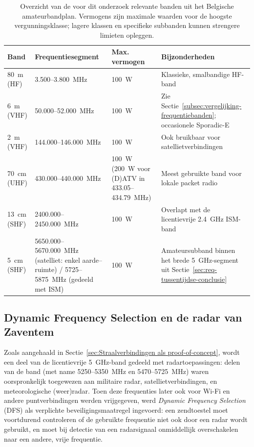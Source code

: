 \begin{table}[h]
  \centering
  \small
  \begin{tabular}{p{2.6cm}p{3.2cm}p{2.6cm}p{5.2cm}}
    \toprule
    \textbf{Band} & \textbf{Frequentiesegment} & \textbf{Max. vermogen} & \textbf{Bijzonderheden} \\
    \midrule
    80~m (HF)     & 3.500--3.800~MHz   & 100~W & Klassieke, smalbandige HF-band \\
    6~m (VHF)     & 50.000--52.000~MHz & 100~W & Zie Sectie~\ref{subsec:vergelijking-frequentiebanden}; occasionele Sporadic-E \\
    2~m (VHF)     & 144.000--146.000~MHz & 100~W & Ook bruikbaar voor satellietverbindingen \\
    70~cm (UHF)   & 430.000--440.000~MHz & 100~W (200~W voor (D)ATV in 433.05--434.79~MHz) & Meest gebruikte band voor lokale packet radio \\
    13~cm (SHF)   & 2400.000--2450.000~MHz & 100~W & Overlapt met de licentievrije 2.4~GHz ISM-band \\
    5~cm (SHF)    & 5650.000--5670.000~MHz (satelliet: enkel aarde--ruimte) / 5725--5875~MHz (gedeeld met ISM) & 100~W & Amateursubband binnen het brede 5~GHz-segment uit Sectie~\ref{sec:req-tussentijdse-conclusie} \\
    \bottomrule
  \end{tabular}
  \caption{Overzicht van de voor dit onderzoek relevante banden uit het Belgische
  amateurbandplan. Vermogens zijn maximale waarden voor de hoogste
  vergunningsklasse; lagere klassen en specifieke subbanden kunnen strengere
  limieten opleggen.}
  \label{tab:frequentieplan}
\end{table}

\subsection{Dynamic Frequency Selection en de radar van Zaventem}%
\label{subsec:dfs}

Zoals aangehaald in Sectie~\ref{sec:Straalverbindingen als proof-of-concept}, wordt een
deel van de licentievrije 5~GHz-band gedeeld met radartoepassingen: delen van de band
(met name 5250--5350~MHz en 5470--5725~MHz) waren oorspronkelijk toegewezen aan
militaire radar, satellietverbindingen, en meteorologische (weer)radar. Toen deze
frequenties later ook voor Wi-Fi en andere puntverbindingen werden vrijgegeven, werd
\textit{Dynamic Frequency Selection} (DFS) als verplichte beveiligingsmaatregel
ingevoerd: een zendtoestel moet voortdurend controleren of de gebruikte frequentie niet
ook door een radar wordt gebruikt, en moet bij detectie van een radarsignaal
onmiddellijk overschakelen naar een andere, vrije frequentie.

